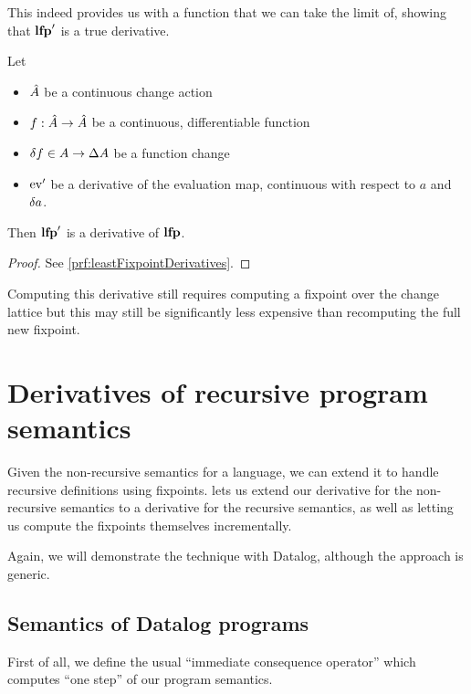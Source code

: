 This indeed provides us with a function that we can take the limit of, showing
that $\mathbf{lfp}'$ is a true derivative.

\begin{thm}[name=Derivatives of least fixpoint operators, restate=leastFixpointDerivatives]
  \label{thm:leastFixpointDerivatives}
  Let
  \begin{itemize}
    \item $\hat{A}$ be a continuous change action
    \item $f : \hat{A} \rightarrow \hat{A}$ be a continuous, differentiable function
    \item $\delta f \in A \rightarrow \Delta A$ be a function change
    \item $\operatorname{ev}'$ be a derivative of the evaluation map, continuous with
      respect to $a$ and $\delta a$.
  \end{itemize}
  Then $\mathbf{lfp}'$ is a derivative of $\mathbf{lfp}$.
\end{thm}
\ifproofs
\begin{proof}
  See \cref{prf:leastFixpointDerivatives}.
\end{proof}
\fi

Computing this derivative still requires computing a fixpoint \textemdash{} over the change
lattice \textemdash{} but this may still be significantly less expensive than
recomputing the full new fixpoint.

\section{Derivatives of recursive program semantics}
\label{sec:recursiveDatalog}

Given the non-recursive semantics for a language, we can extend it to handle
recursive definitions using fixpoints.  lets us extend our
derivative for the non-recursive semantics to a derivative for the recursive
semantics, as well as letting us compute the fixpoints themselves
incrementally. 

Again, we will demonstrate the technique with Datalog, although the approach is generic.

\subsection{Semantics of Datalog programs}

First of all, we define the usual ``immediate consequence operator'' which
computes ``one step'' of our program semantics.

